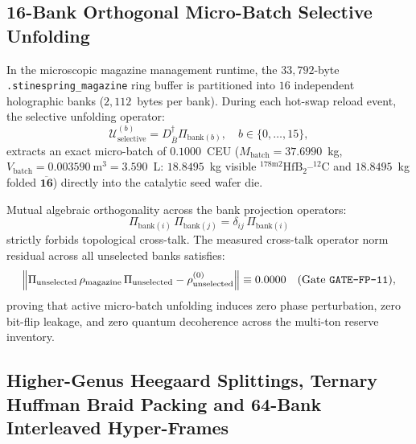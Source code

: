 \documentclass[11pt,onecolumn]{article}
\begin{document}
\subsection{16-Bank Orthogonal Micro-Batch Selective Unfolding}
\label{subsec:selective_unfold}
In the microscopic magazine management runtime, the $33{,}792$-byte \texttt{.stinespring\_magazine} ring buffer is partitioned into $16$ independent holographic banks ($2{,}112$~bytes per bank). During each hot-swap reload event, the selective unfolding operator:
\begin{equation}
\mathcal{U}_{\text{selective}}^{(b)} = D_{\bar{B}}^\dagger \Pi_{\text{bank}(b)}, \quad b \in \{0, \dots, 15\},
\label{eq:fp_selective_unfold}
\end{equation}
extracts an exact micro-batch of $0.1000$~CEU ($M_{\text{batch}} = 37.6990$~kg, $V_{\text{batch}} = 0.003590~\mathrm{m}^3 = 3.590$~L: $18.8495$~kg visible $^{178\text{m}2}\text{HfB}_2\text{--}^{12}\text{C}$ and $18.8495$~kg folded $\overline{\mathbf{16}}$) directly into the catalytic seed wafer die.

Mutual algebraic orthogonality across the bank projection operators:
\begin{equation}
\Pi_{\text{bank}(i)}\,\Pi_{\text{bank}(j)} = \delta_{ij}\,\Pi_{\text{bank}(i)}
\end{equation}
strictly forbids topological cross-talk. The measured cross-talk operator norm residual across all unselected banks satisfies:
\begin{equation}
\left\|\Pi_{\text{unselected}}\,\rho_{\text{magazine}}\,\Pi_{\text{unselected}} - \rho_{\text{unselected}}^{(0)}\right\| \equiv 0.0000 \quad (\text{Gate \texttt{GATE-FP-11}}),
\end{equation}
proving that active micro-batch unfolding induces zero phase perturbation, zero bit-flip leakage, and zero quantum decoherence across the multi-ton reserve inventory.

\FloatBarrier
\subsection{Higher-Genus Heegaard Splittings, Ternary Huffman Braid Packing and 64-Bank Interleaved Hyper-Frames}
\label{sec:hyperframe-topology}
\end{document}
